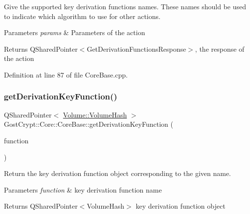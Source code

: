 Give the supported key derivation functions names. These names should be used to indicate which algorithm to use for other actions. 


\begin{DoxyParams}{Parameters}
{\em params} & Parameters of the action \\
\hline
\end{DoxyParams}
\begin{DoxyReturn}{Returns}
Q\+Shared\+Pointer$<$\+Get\+Derivation\+Functions\+Response$>$, the response of the action 
\end{DoxyReturn}


Definition at line 87 of file Core\+Base.\+cpp.

\mbox{\label{class_gost_crypt_1_1_core_1_1_core_base_af5bf7852935d5ab56ae8bbdd581f589a}} 
\subsubsection{\texorpdfstring{get\+Derivation\+Key\+Function()}{getDerivationKeyFunction()}}
{\footnotesize\ttfamily Q\+Shared\+Pointer$<$ \hyperlink{class_gost_crypt_1_1_volume_1_1_volume_hash}{Volume\+::\+Volume\+Hash} $>$ Gost\+Crypt\+::\+Core\+::\+Core\+Base\+::get\+Derivation\+Key\+Function (\begin{DoxyParamCaption}\item[{Q\+String}]{function }\end{DoxyParamCaption})\hspace{0.3cm}{\ttfamily [protected]}}



Return the key derivation function object corresponding to the given name. 


\begin{DoxyParams}{Parameters}
{\em function} & key derivation function name \\
\hline
\end{DoxyParams}
\begin{DoxyReturn}{Returns}
Q\+Shared\+Pointer$<$\+Volume\+Hash$>$ key derivation function object 
\end{DoxyReturn}


